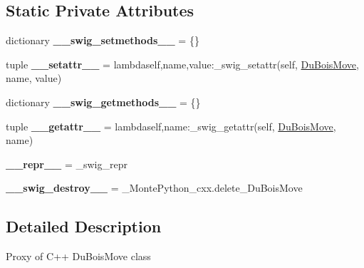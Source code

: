 \subsection*{Static Private Attributes}
\begin{DoxyCompactItemize}
\item 
\hypertarget{classMontePython__cxx_1_1DuBoisMove_a7e1aad681435b4cda58621abef8081cf}{}dictionary {\bfseries \+\_\+\+\_\+swig\+\_\+setmethods\+\_\+\+\_\+} = \{\}\label{classMontePython__cxx_1_1DuBoisMove_a7e1aad681435b4cda58621abef8081cf}

\item 
\hypertarget{classMontePython__cxx_1_1DuBoisMove_a30e7ada4adb81be7a29ee08da8754d52}{}tuple {\bfseries \+\_\+\+\_\+setattr\+\_\+\+\_\+} = lambdaself,name,value\+:\+\_\+swig\+\_\+setattr(self, \hyperlink{classMontePython__cxx_1_1DuBoisMove}{Du\+Bois\+Move}, name, value)\label{classMontePython__cxx_1_1DuBoisMove_a30e7ada4adb81be7a29ee08da8754d52}

\item 
\hypertarget{classMontePython__cxx_1_1DuBoisMove_ab87a99207e02ec19bb2cfb389390a584}{}dictionary {\bfseries \+\_\+\+\_\+swig\+\_\+getmethods\+\_\+\+\_\+} = \{\}\label{classMontePython__cxx_1_1DuBoisMove_ab87a99207e02ec19bb2cfb389390a584}

\item 
\hypertarget{classMontePython__cxx_1_1DuBoisMove_a214d0ed1b400ce4fbd96b58fd6585140}{}tuple {\bfseries \+\_\+\+\_\+getattr\+\_\+\+\_\+} = lambdaself,name\+:\+\_\+swig\+\_\+getattr(self, \hyperlink{classMontePython__cxx_1_1DuBoisMove}{Du\+Bois\+Move}, name)\label{classMontePython__cxx_1_1DuBoisMove_a214d0ed1b400ce4fbd96b58fd6585140}

\item 
\hypertarget{classMontePython__cxx_1_1DuBoisMove_aef5801e3a8ed46391bfa3c76cc7ab62f}{}{\bfseries \+\_\+\+\_\+repr\+\_\+\+\_\+} = \+\_\+swig\+\_\+repr\label{classMontePython__cxx_1_1DuBoisMove_aef5801e3a8ed46391bfa3c76cc7ab62f}

\item 
\hypertarget{classMontePython__cxx_1_1DuBoisMove_a82ebfcd11327d4a7c2011195cd77e388}{}{\bfseries \+\_\+\+\_\+swig\+\_\+destroy\+\_\+\+\_\+} = \+\_\+\+Monte\+Python\+\_\+cxx.\+delete\+\_\+\+Du\+Bois\+Move\label{classMontePython__cxx_1_1DuBoisMove_a82ebfcd11327d4a7c2011195cd77e388}

\end{DoxyCompactItemize}


\subsection{Detailed Description}
\begin{DoxyVerb}Proxy of C++ DuBoisMove class\end{DoxyVerb}
 


